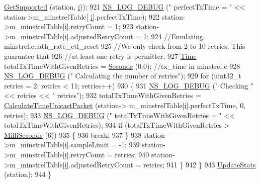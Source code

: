 \begin{DoxyCode}
      \hyperlink{classns3_1_1WifiRemoteStationManager_a995c8bae0d84b168fd3e8bc9ecaacdd4}{GetSupported} (station, \hyperlink{bernuolliDistribution_8m_a6f6ccfcf58b31cb6412107d9d5281426}{i}));
921       \hyperlink{group__logging_ga413f1886406d49f59a6a0a89b77b4d0a}{NS\_LOG\_DEBUG} (\textcolor{stringliteral}{" perfectTxTime = "} << station->m\_minstrelTable[
      \hyperlink{bernuolliDistribution_8m_a6f6ccfcf58b31cb6412107d9d5281426}{i}].perfectTxTime);
922       station->m\_minstrelTable[\hyperlink{bernuolliDistribution_8m_a6f6ccfcf58b31cb6412107d9d5281426}{i}].retryCount = 1;
923       station->m\_minstrelTable[\hyperlink{bernuolliDistribution_8m_a6f6ccfcf58b31cb6412107d9d5281426}{i}].adjustedRetryCount = 1;
924       \textcolor{comment}{//Emulating minstrel.c::ath\_rate\_ctl\_reset}
925       \textcolor{comment}{//We only check from 2 to 10 retries. This guarantee that}
926       \textcolor{comment}{//at least one retry is permitter.}
927       \hyperlink{namespacens3_1_1TracedValueCallback_a7ffd3e7c142ffe7c8a1d2db9b8de38ec}{Time} totalTxTimeWithGivenRetries = \hyperlink{group__timecivil_ga33c34b816f8ff6628e33d5c8e9713b9e}{Seconds} (0.0); \textcolor{comment}{//tx\_time in minstrel.c}
928       \hyperlink{group__logging_ga413f1886406d49f59a6a0a89b77b4d0a}{NS\_LOG\_DEBUG} (\textcolor{stringliteral}{" Calculating the number of retries"});
929       \textcolor{keywordflow}{for} (uint32\_t retries = 2; retries < 11; retries++)
930         \{
931           \hyperlink{group__logging_ga413f1886406d49f59a6a0a89b77b4d0a}{NS\_LOG\_DEBUG} (\textcolor{stringliteral}{"  Checking "} << retries << \textcolor{stringliteral}{" retries"});
932           totalTxTimeWithGivenRetries = \hyperlink{classns3_1_1MinstrelWifiManager_ab619fbd9813b4672149eaa5b0a9e8298}{CalculateTimeUnicastPacket} (station->
      m\_minstrelTable[\hyperlink{bernuolliDistribution_8m_a6f6ccfcf58b31cb6412107d9d5281426}{i}].perfectTxTime, 0, retries);
933           \hyperlink{group__logging_ga413f1886406d49f59a6a0a89b77b4d0a}{NS\_LOG\_DEBUG} (\textcolor{stringliteral}{"   totalTxTimeWithGivenRetries = "} << totalTxTimeWithGivenRetries);
934           \textcolor{keywordflow}{if} (totalTxTimeWithGivenRetries > \hyperlink{group__timecivil_gaf26127cf4571146b83a92ee18679c7a9}{MilliSeconds} (6))
935             \{
936               \textcolor{keywordflow}{break};
937             \}
938           station->m\_minstrelTable[\hyperlink{bernuolliDistribution_8m_a6f6ccfcf58b31cb6412107d9d5281426}{i}].sampleLimit = -1;
939           station->m\_minstrelTable[\hyperlink{bernuolliDistribution_8m_a6f6ccfcf58b31cb6412107d9d5281426}{i}].retryCount = retries;
940           station->m\_minstrelTable[\hyperlink{bernuolliDistribution_8m_a6f6ccfcf58b31cb6412107d9d5281426}{i}].adjustedRetryCount = retries;
941         \}
942     \}
943   \hyperlink{classns3_1_1MinstrelWifiManager_a5702af5353375bbb7099b41b76fc7c21}{UpdateStats} (station);
944 \}
\end{DoxyCode}


